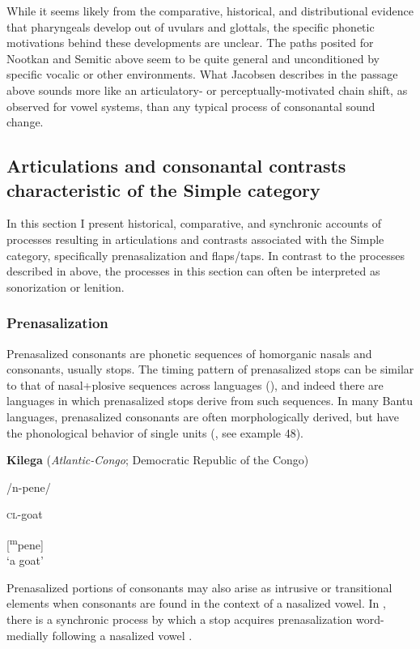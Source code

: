   While it seems likely from the comparative, historical, and distributional evidence that pharyngeals develop out of uvulars and glottals, the specific phonetic motivations behind these developments are unclear. The paths posited for Nootkan and Semitic above seem to be quite general and unconditioned by specific vocalic or other environments. What Jacobsen describes in the passage above sounds more like an articulatory- or perceptually-motivated chain shift, as observed for vowel systems, than any typical process of consonantal sound change.

\subsection{Articulations and consonantal contrasts characteristic of the Simple category}\label{sec:4.5.3}

  In this section I present historical, comparative, and synchronic accounts of processes resulting in articulations and contrasts associated with the Simple category, specifically prenasalization and flaps/taps. In contrast to the processes described in  above, the processes in this section can often be interpreted as sonorization or lenition.

\subsubsection{{Prenasalization} }\label{sec:4.5.3.1}

  Prenasalized consonants are phonetic sequences of homorganic nasals and consonants, usually stops. The timing pattern of prenasalized stops can be similar to that of nasal+plosive sequences across languages (\citealt{BrowmanGoldstein1986}), and indeed there are languages in which prenasalized stops derive from such sequences. In many Bantu languages, prenasalized consonants are often morphologically derived, but have the phonological behavior of single units (\citealt{Tak2011}, see example 48).

\ea\label{ex:4.48}
  \textbf{Kilega} (\textit{Atlantic-Congo}; Democratic Republic of the Congo)

/n-pene/

\textsc{cl}-goat

[\textsuperscript{m}pene]\\
\glt ‘a goat’
\citep[132]{Tak2011}
\z

  Prenasalized portions of consonants may also arise as intrusive or transitional elements when consonants are found in the context of a nasalized vowel. In , there is a synchronic process by which a stop acquires prenasalization word-medially following a nasalized vowel .

